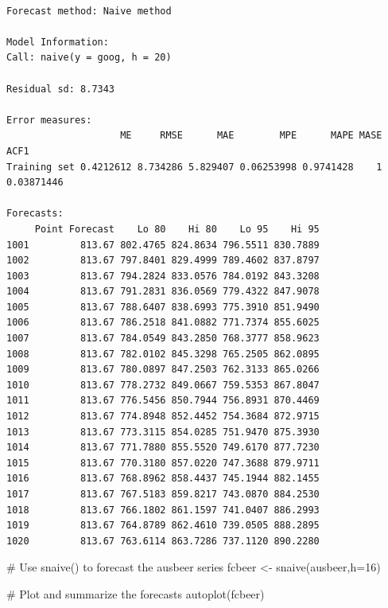 \documentclass[
  letterpaper,
  DIV=11,
  numbers=noendperiod]{scrartcl}
\newenvironment{Shaded}{\begin{snugshade}}{\end{snugshade}}
\newcommand{\AttributeTok}[1]{\textcolor[rgb]{0.40,0.45,0.13}{#1}}
\newcommand{\CommentTok}[1]{\textcolor[rgb]{0.37,0.37,0.37}{#1}}
\newcommand{\DecValTok}[1]{\textcolor[rgb]{0.68,0.00,0.00}{#1}}
\newcommand{\FunctionTok}[1]{\textcolor[rgb]{0.28,0.35,0.67}{#1}}
\newcommand{\NormalTok}[1]{\textcolor[rgb]{0.00,0.23,0.31}{#1}}
\newcommand{\OtherTok}[1]{\textcolor[rgb]{0.00,0.23,0.31}{#1}}
\begin{document}
\begin{verbatim}

Forecast method: Naive method

Model Information:
Call: naive(y = goog, h = 20) 

Residual sd: 8.7343 

Error measures:
                    ME     RMSE      MAE        MPE      MAPE MASE       ACF1
Training set 0.4212612 8.734286 5.829407 0.06253998 0.9741428    1 0.03871446

Forecasts:
     Point Forecast    Lo 80    Hi 80    Lo 95    Hi 95
1001         813.67 802.4765 824.8634 796.5511 830.7889
1002         813.67 797.8401 829.4999 789.4602 837.8797
1003         813.67 794.2824 833.0576 784.0192 843.3208
1004         813.67 791.2831 836.0569 779.4322 847.9078
1005         813.67 788.6407 838.6993 775.3910 851.9490
1006         813.67 786.2518 841.0882 771.7374 855.6025
1007         813.67 784.0549 843.2850 768.3777 858.9623
1008         813.67 782.0102 845.3298 765.2505 862.0895
1009         813.67 780.0897 847.2503 762.3133 865.0266
1010         813.67 778.2732 849.0667 759.5353 867.8047
1011         813.67 776.5456 850.7944 756.8931 870.4469
1012         813.67 774.8948 852.4452 754.3684 872.9715
1013         813.67 773.3115 854.0285 751.9470 875.3930
1014         813.67 771.7880 855.5520 749.6170 877.7230
1015         813.67 770.3180 857.0220 747.3688 879.9711
1016         813.67 768.8962 858.4437 745.1944 882.1455
1017         813.67 767.5183 859.8217 743.0870 884.2530
1018         813.67 766.1802 861.1597 741.0407 886.2993
1019         813.67 764.8789 862.4610 739.0505 888.2895
1020         813.67 763.6114 863.7286 737.1120 890.2280
\end{verbatim}

\begin{Shaded}
\begin{Highlighting}[]
\CommentTok{\# Use snaive() to forecast the ausbeer series}
\NormalTok{fcbeer }\OtherTok{\textless{}{-}} \FunctionTok{snaive}\NormalTok{(ausbeer,}\AttributeTok{h=}\DecValTok{16}\NormalTok{)}

\CommentTok{\# Plot and summarize the forecasts}
\FunctionTok{autoplot}\NormalTok{(fcbeer)}
\end{Highlighting}
\end{Shaded}
\end{document}
